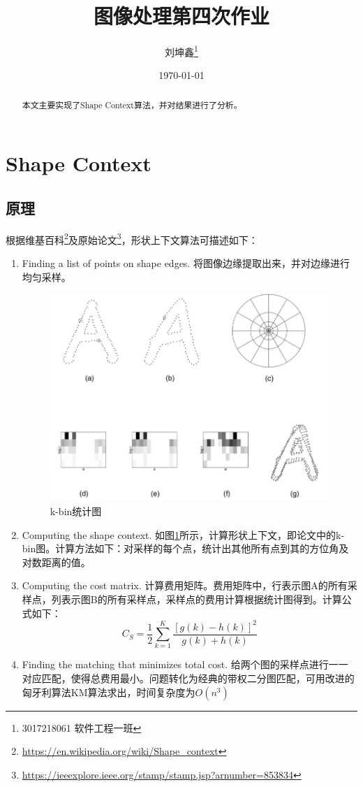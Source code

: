 \documentclass{article}
\begin{document}
\title{图像处理第四次作业}
\author{刘坤鑫\thanks{3017218061 软件工程一班}}
\date{\today}
\maketitle
\begin{abstract}
本文主要实现了Shape Context算法，并对结果进行了分析。
\end{abstract}

\section{Shape Context}

\subsection{原理}

根据维基百科\footnote{\url{https://en.wikipedia.org/wiki/Shape_context}}及原始论文\footnote{\url{https://ieeexplore.ieee.org/stamp/stamp.jsp?arnumber=853834}}，形状上下文算法可描述如下：

\begin{enumerate}
	\item Finding a list of points on shape edges. 将图像边缘提取出来，并对边缘进行均匀采样。
\begin{figure}[ht]
	\centering
	\includegraphics[width=0.7\linewidth]{fig/1}
	\caption{k-bin统计图}
	\label{fig:1}
\end{figure}
	\item Computing the shape context. 如图\ref{fig:1}所示，计算形状上下文，即论文中的k-bin图。计算方法如下：对采样的每个点，统计出其他所有点到其的方位角及对数距离的值。
	\item Computing the cost matrix. 计算费用矩阵。费用矩阵中，行表示图A的所有采样点，列表示图B的所有采样点，采样点的费用计算根据统计图得到。计算公式如下：
\begin{equation}
C_{S}=\frac{1}{2} \sum_{k=1}^{K} \frac{[g(k)-h(k)]^{2}}{g(k)+h(k)}
\end{equation}
	\item Finding the matching that minimizes total cost. 给两个图的采样点进行一一对应匹配，使得总费用最小。问题转化为经典的带权二分图匹配，可用改进的匈牙利算法KM算法求出，时间复杂度为$O(n^3)$
\end{enumerate}
\end{document}

